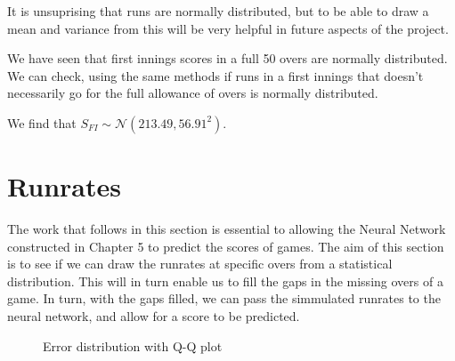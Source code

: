 It is unsuprising that runs are normally distributed, but to be able to draw a mean and variance from this will be very helpful in future aspects of the project.

We have seen that first innings scores in a full 50 overs are normally distributed. We can check, using the same methods if runs in a first innings that 
doesn't necessarily go for the full allowance of overs is normally distributed. 

We find that $S_{FI} \sim \mathcal{N}(213.49,56.91^2)$. 

\section{Runrates}
\label{exprr}
The work that follows in this section is essential to allowing the Neural Network constructed in Chapter 5 to predict the scores of games. The aim of this section is 
to see if we can draw the runrates at specific overs from a statistical distribution. This will in turn enable us to fill the gaps in the missing overs of a game. In turn, 
with the gaps filled, we can pass the simmulated runrates to the neural network, and allow for a score to be predicted. 

\begin{figure}[h]
    \centering
    \qquad
    \caption{Error distribution with Q-Q plot}
    \label{errdistqq2}
\end{figure}

